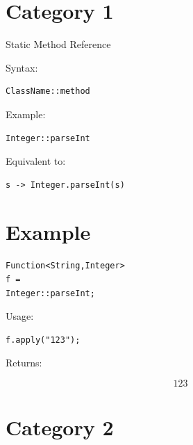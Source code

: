 \documentclass[11pt,a4paper]{book}
\begin{document}
\section{Category 1}

Static Method Reference


Syntax:

\begin{verbatim} 
ClassName::method
\end{verbatim}


Example:

\begin{verbatim} 
Integer::parseInt
\end{verbatim}


Equivalent to:

\begin{verbatim} 
s -> Integer.parseInt(s)
\end{verbatim}


\section{Example}

\begin{verbatim} 
Function<String,Integer>
f =
Integer::parseInt;
\end{verbatim}


Usage:

\begin{verbatim} 
f.apply("123");
\end{verbatim}


Returns:

\[
123
\]


\section{Category 2}
\end{document}
